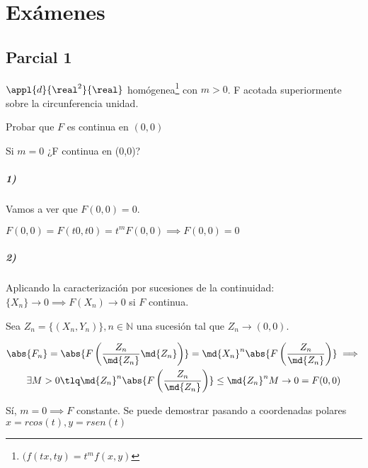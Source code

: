 \section{Exámenes}

\subsection{Parcial 1}

\begin{problem}[1]

$\appl{d}{\real^2}{\real}$ homógenea\footnote{$(f(tx,ty) = t^mf(x,y)$} con $m>0$. F acotada superiormente sobre la circunferencia unidad.

\ppart Probar que $F$ es continua en $(0,0)$

\ppart Si $m=0$ ¿F continua en (0,0)?

\solution

\spart
\subparagraph{1)}
Vamos a ver que $F(0,0) = 0$.

$F(0,0) = F(t0,t0) = t^mF(0,0) \implies F(0,0) = 0$

\subparagraph{2)}
Aplicando la caracterización por sucesiones de la continuidad: $\{X_n\} \rightarrow 0 \implies F(X_n) \rightarrow 0$ si $F$ continua.

Sea $Z_n = \{(X_n,Y_n)\}, n\in \mathbb{N}$ una sucesión tal que $Z_n \rightarrow (0,0)$.

\begin{gather*}\abs{F_n} = \abs{F\left(\frac{Z_n}{\md{Z_n}}\md{Z_n}\right)} =
\md{X_n}^n \abs{F\left(\frac{Z_n}{\md{Z_n}}\right)} \implies \\
\exists M>0 \tlq \md{Z_n}^n \abs{F\left(\frac{Z_n}{\md{Z_n}}\right)} \leq \md{Z_n}^n M \rightarrow 0 = F(0,0)
\end{gather*}

\spart
Sí, $m=0 \implies F$ constante. Se puede demostrar pasando a coordenadas polares $x=rcos(t),y=rsen(t)$

\end{problem}

